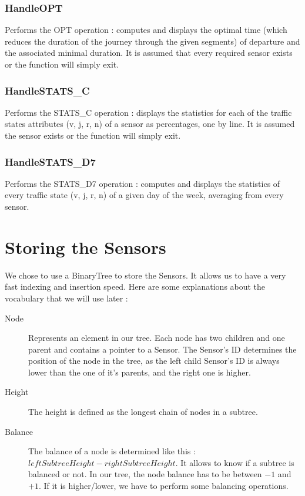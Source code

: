 \documentclass[10pt]{article}
\begin{document}
\subsubsection*{HandleOPT}
Performs the OPT operation : computes and displays the optimal time (which reduces the duration of the journey through the given segments) of departure and the associated minimal duration. It is assumed that every required sensor exists or the function will simply exit.

\subsubsection*{HandleSTATS\_C}
Performs the STATS\_C operation : displays the statistics for each of the traffic states attributes (v, j, r, n) of a sensor as percentages, one by line. It is assumed the sensor exists or the function will simply exit.

\subsubsection*{HandleSTATS\_D7}
Performs the STATS\_D7 operation : computes and displays the statistics of every traffic state (v, j, r, n) of a given day of the week, averaging from every sensor.

\section{Storing the Sensors}

We chose to use a BinaryTree to store the Sensors. It allows us to have a very fast indexing and insertion speed.
Here are some explanations about the vocabulary that we will use later :

\begin{description}
	\item[Node] Represents an element in our tree. Each node has two children and one parent and contains a pointer to a Sensor. The Sensor's ID determines the position of the node in the tree, as the left child Sensor's ID is always lower than the one of it's parents, and the right one is higher.
	\item[Height] The height is defined as the longest chain of nodes in a subtree.
	\item[Balance] The balance of a node is determined like this : $ leftSubtreeHeight - rightSubtreeHeight$. It allows to know if a subtree is balanced or not. In our tree, the node balance has to be between $-1$ and $+1$. If it is higher/lower, we have to perform some balancing operations.
\end{description}
\end{document}
